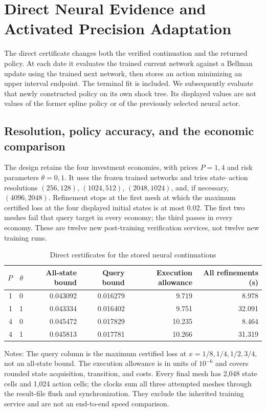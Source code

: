 \section{Direct Neural Evidence and Activated Precision Adaptation}
\label{sec:r41evidence}
The direct certificate changes both the verified continuation and the
returned policy. At each date it evaluates the trained current network
against a Bellman update using the trained next network, then stores an
action minimizing an upper interval endpoint. The terminal fit is included.
We subsequently evaluate that newly constructed policy on its own shock
tree. Its displayed values are not values of the former spline policy or
of the previously selected neural actor.

\subsection{Resolution, policy accuracy, and the economic comparison}
The design retains the four investment economies, with prices $P=1,4$ and
risk parameters $\theta=0,1$. It uses the frozen trained networks and tries
state--action resolutions $(256,128)$, $(1024,512)$, $(2048,1024)$, and,
if necessary, $(4096,2048)$. Refinement stops at the first mesh at which the
maximum certified loss at the four displayed initial states is at most
$0.02$. The first two meshes fail that query target in every economy;
the third passes in every economy. These are twelve new post-training
verification services, not twelve new training runs.

\begin{table}[htbp]\centering\small
\caption{Direct certificates for the stored neural continuations}\label{tab:r41direct}
\begin{tabular}{rrrrrr}\toprule
$P$ & $\theta$ & All-state bound & Query bound & Execution allowance & All refinements (s)\\\midrule
1 & 0 & 0.043092 & 0.016279 & 9.719 & 8.978\\
1 & 1 & 0.043334 & 0.016402 & 9.751 & 32.091\\
4 & 0 & 0.045472 & 0.017829 & 10.235 & 8.464\\
4 & 1 & 0.045813 & 0.017781 & 10.266 & 31.319\\
\bottomrule\end{tabular}
\par\smallskip\begin{minipage}{.97\textwidth}\footnotesize Notes: The query column is the maximum certified loss at $x=1/8,1/4,1/2,3/4$, not an all-state bound. The execution allowance is in units of $10^{-6}$ and covers rounded state acquisition, transition, and costs. Every final mesh has 2,048 state cells and 1,024 action cells; the clocks sum all three attempted meshes through the result-file flush and synchronization. They exclude the inherited training service and are not an end-to-end speed comparison.\end{minipage}\end{table}

